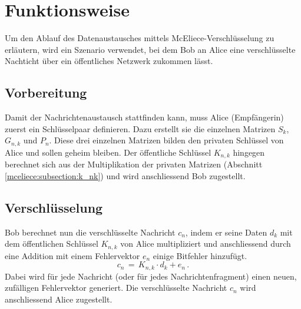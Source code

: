 %
%
%
\section{Funktionsweise 
\label{mceliece:section:funktionsweise}}
Um den Ablauf des Datenaustausches mittels McEliece-Verschlüsselung zu erläutern,
wird ein Szenario verwendet,
bei dem Bob an Alice eine verschlüsselte Nachticht über ein öffentliches Netzwerk zukommen lässt.

\subsection{Vorbereitung
\label{mceliece:section:vorbereitung}}
Damit der Nachrichtenaustausch stattfinden kann, muss Alice (Empfängerin)
zuerst ein Schlüsselpaar definieren.
Dazu erstellt sie die einzelnen Matrizen $S_k$, $G_{n,k}$ und $P_n$.
Diese drei einzelnen Matrizen bilden den privaten Schlüssel von Alice
und sollen geheim bleiben.
Der öffentliche Schlüssel $K_{n,k}$ hingegen berechnet sich
aus der Multiplikation der privaten Matrizen (Abschnitt \ref{mceliece:subsection:k_nk})
und wird anschliessend Bob zugestellt.

\subsection{Verschlüsselung
\label{mceliece:section:verschl}}
Bob berechnet nun die verschlüsselte Nachricht $c_n$, indem er seine Daten $d_k$
mit dem öffentlichen Schlüssel $K_{n,k}$ von Alice multipliziert
und anschliessend durch eine Addition mit einem Fehlervektor $e_n$ einige Bitfehler hinzufügt.
\[
    c_n\,=\,K_{n,k}\cdot d_k + e_n\,.
\]
Dabei wird für jede Nachricht (oder für jedes Nachrichtenfragment)
einen neuen, zufälligen Fehlervektor generiert.
Die verschlüsselte Nachricht $c_n$ wird anschliessend Alice zugestellt.

